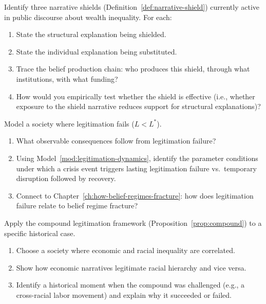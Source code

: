 \begin{exercise}
Identify three narrative shields (Definition~\ref{def:narrative-shield}) currently active in public discourse about wealth inequality.
For each:
\begin{enumerate}[nosep]
  \item State the structural explanation being shielded.
  \item State the individual explanation being substituted.
  \item Trace the belief production chain: who produces this shield, through what institutions, with what funding?
  \item How would you empirically test whether the shield is effective (i.e., whether exposure to the shield narrative reduces support for structural explanations)?
\end{enumerate}
\end{exercise}

\begin{exercise}
Model a society where legitimation fails ($L < L^*$).
\begin{enumerate}[nosep]
  \item What observable consequences follow from legitimation failure?
  \item Using Model~\ref{mod:legitimation-dynamics}, identify the parameter conditions under which a crisis event triggers lasting legitimation failure vs.\ temporary disruption followed by recovery.
  \item Connect to Chapter~\ref{ch:how-belief-regimes-fracture}: how does legitimation failure relate to belief regime fracture?
\end{enumerate}
\end{exercise}

\begin{exercise}
Apply the compound legitimation framework (Proposition~\ref{prop:compound}) to a specific historical case.
\begin{enumerate}[nosep]
  \item Choose a society where economic and racial inequality are correlated.
  \item Show how economic narratives legitimate racial hierarchy and vice versa.
  \item Identify a historical moment when the compound was challenged (e.g., a cross-racial labor movement) and explain why it succeeded or failed.
\end{enumerate}
\end{exercise}

